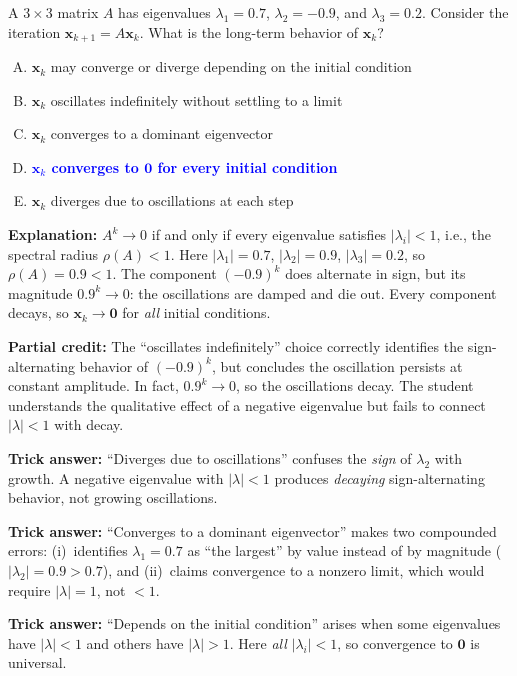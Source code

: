 \documentclass[12pt]{amsart}
\begin{document}
A $3 \times 3$ matrix $A$ has eigenvalues $\lambda_1 = 0.7$,
$\lambda_2 = -0.9$, and $\lambda_3 = 0.2$.
Consider the iteration $\mathbf{x}_{k+1} = A\mathbf{x}_k$.
What is the long-term behavior of $\mathbf{x}_k$?

\begin{enumerate}[(A)]
\item $\mathbf{x}_k$ may converge or diverge depending on the initial
      condition
\item $\mathbf{x}_k$ oscillates indefinitely without settling to a limit
\item $\mathbf{x}_k$ converges to a dominant eigenvector
\item \textcolor{blue}{\textbf{$\mathbf{x}_k$ converges to $\mathbf{0}$
      for every initial condition}}
\item $\mathbf{x}_k$ diverges due to oscillations at each step
\end{enumerate}

\textbf{Explanation:}
$A^k \to 0$ if and only if every eigenvalue satisfies $|\lambda_i| < 1$,
i.e., the spectral radius $\rho(A) < 1$. Here $|\lambda_1| = 0.7$,
$|\lambda_2| = 0.9$, $|\lambda_3| = 0.2$, so $\rho(A) = 0.9 < 1$.
The component $(-0.9)^k$ does alternate in sign, but its magnitude
$0.9^k \to 0$: the oscillations are damped and die out. Every component
decays, so $\mathbf{x}_k \to \mathbf{0}$ for \emph{all} initial conditions.

\textbf{Partial credit:}
The ``oscillates indefinitely'' choice correctly identifies the
sign-alternating behavior of $(-0.9)^k$, but concludes the oscillation
persists at constant amplitude. In fact, $0.9^k \to 0$, so the
oscillations decay. The student understands the qualitative effect of a
negative eigenvalue but fails to connect $|\lambda| < 1$ with decay.

\textbf{Trick answer:}
``Diverges due to oscillations'' confuses the \emph{sign} of $\lambda_2$
with growth. A negative eigenvalue with $|\lambda| < 1$ produces
\emph{decaying} sign-alternating behavior, not growing oscillations.

\textbf{Trick answer:}
``Converges to a dominant eigenvector'' makes two compounded errors:
(i)~identifies $\lambda_1 = 0.7$ as ``the largest'' by value instead of
by magnitude ($|\lambda_2| = 0.9 > 0.7$), and (ii)~claims convergence to
a nonzero limit, which would require $|\lambda| = 1$, not $< 1$.

\textbf{Trick answer:}
``Depends on the initial condition'' arises when some eigenvalues have
$|\lambda| < 1$ and others have $|\lambda| > 1$. Here \emph{all}
$|\lambda_i| < 1$, so convergence to $\mathbf{0}$ is universal.
\end{document}

